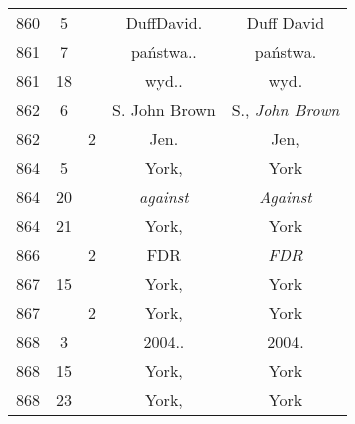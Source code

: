\documentclass[a4paper,11pt]{article}
\numberwithin{equation}{section}
\begin{document}
\begin{center}
\begin{tabular}{|c|c|c|c|c|}
    860 & \hphantom{0}5 & & DuffDavid. & Duff David \\
    861 & \hphantom{0}7 & & państwa.. & państwa. \\
    861 & 18 & & wyd.. & wyd. \\
    862 & \hphantom{0}6 & & S. John Brown & S., \textit{John Brown} \\
    862 & & \hphantom{0}2 & Jen. & Jen, \\
    864 & \hphantom{0}5 & & York, & York \\
    864 & 20 & & \textit{against} & \textit{Against} \\
    864 & 21 & & York, & York \\
    866 & & \hphantom{0}2 & FDR & \textit{FDR} \\
    867 & 15 & & York, & York \\
    867 & & \hphantom{0}2 & York, & York \\
    868 & \hphantom{0}3 & & 2004.. & 2004. \\
    868 & 15 & & York, & York \\
    868 & 23 & & York, & York \\
    \hline
  \end{tabular}





  \newpage


\end{center}
\end{document}
